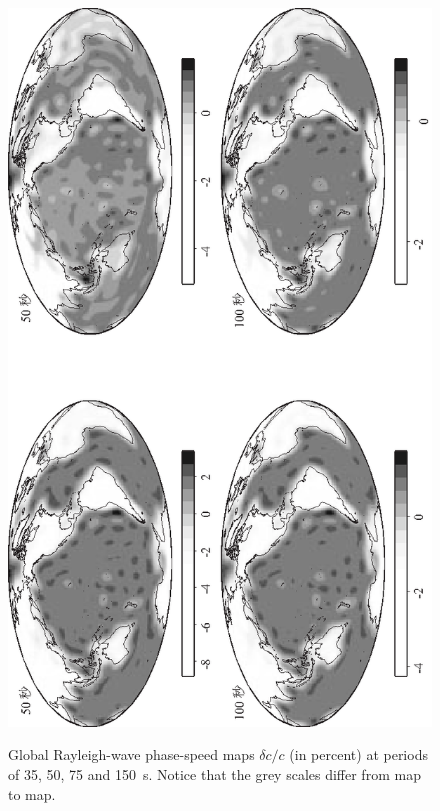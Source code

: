 \begin{figure}
\begin{center}
{
\includegraphics{../figures/chap16/fig20.eps}
}
\end{center}
\caption[phase_mapsR]{
Global Rayleigh-wave phase-speed maps $\delta c/c$
(in percent) at periods of 35, 50, 75 and 150~s.
Notice that the grey scales differ from map to map.
}
\label{fig:16.phase_mapsR}
\end{figure}
